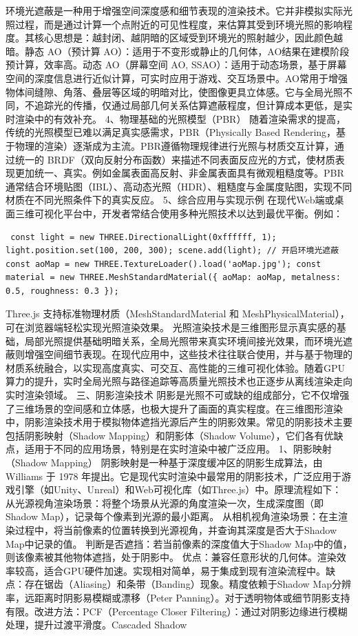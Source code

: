 {{环境光遮蔽是一种用于增强空间深度感和细节表现的渲染技术。它并非模拟实际光照过程，而是通过计算一个点附近的可见性程度，来估算其受到环境光照的影响程度。其核心思想是：越封闭、越阴暗的区域受到环境光的照射越少，因此颜色越暗。静态 AO（预计算 AO）：适用于不变形或静止的几何体，AO结果在建模阶段预计算，效率高。动态 AO（屏幕空间 AO, SSAO）：适用于动态场景，基于屏幕空间的深度信息进行近似计算，可实时应用于游戏、交互场景中。AO常用于增强物体间缝隙、角落、叠层等区域的明暗对比，使图像更具立体感。它与全局光照不同，不追踪光的传播，仅通过局部几何关系估算遮蔽程度，但计算成本更低，是实时渲染中的有效补充。 4、物理基础的光照模型（PBR） 随着渲染需求的提高，传统的光照模型已难以满足真实感需求，PBR（Physically Based Rendering，基于物理的渲染）逐渐成为主流。PBR遵循物理规律进行光照与材质交互计算，通过统一的 BRDF（双向反射分布函数）来描述不同表面反应光的方式，使材质表现更加统一、真实。例如金属表面高反射、非金属表面具有微观粗糙度等。PBR通常结合环境贴图（IBL）、高动态光照（HDR）、粗糙度与金属度贴图，实现不同材质在不同光照条件下的真实反应。 5、综合应用与实现示例 在现代Web端或桌面三维可视化平台中，开发者常结合使用多种光照技术以达到最优平衡。例如： \begin{verbatim} const light = new THREE.DirectionalLight(0xffffff, 1); light.position.set(100, 200, 300); scene.add(light); // 开启环境光遮蔽 const aoMap = new THREE.TextureLoader().load('aoMap.jpg'); const material = new THREE.MeshStandardMaterial({ aoMap: aoMap, metalness: 0.5, roughness: 0.3 }); \end{verbatim} Three.js 支持标准物理材质（MeshStandardMaterial 和 MeshPhysicalMaterial），可在浏览器端轻松实现光照渲染效果。 光照渲染技术是三维图形显示真实感的基础，局部光照提供基础明暗关系，全局光照带来真实环境间接光效果，而环境光遮蔽则增强空间细节表现。在现代应用中，这些技术往往联合使用，并与基于物理的材质系统融合，以实现高度真实、可交互、高性能的三维可视化体验。随着GPU算力的提升，实时全局光照与路径追踪等高质量光照技术也正逐步从离线渲染走向实时渲染领域。 三、阴影渲染技术 阴影是光照不可或缺的组成部分，它不仅增强了三维场景的空间感和立体感，也极大提升了画面的真实程度。在三维图形渲染中，阴影渲染技术用于模拟物体遮挡光源后产生的阴影效果。常见的阴影技术主要包括阴影映射（Shadow Mapping）和阴影体（Shadow Volume），它们各有优缺点，适用于不同的应用场景，特别是在实时渲染中被广泛应用。 1、阴影映射（Shadow Mapping） 阴影映射是一种基于深度缓冲区的阴影生成算法，由 Williams 于 1978 年提出。它是现代实时渲染中最常用的阴影技术，广泛应用于游戏引擎（如Unity、Unreal）和Web可视化库（如Three.js）中。原理流程如下： 从光源视角渲染场景：将整个场景从光源的角度渲染一次，生成深度图（即 Shadow Map），记录每个像素到光源的最小距离。 从相机视角渲染场景：在主渲染过程中，将当前像素的位置转换到光源视角，并查询其深度是否大于Shadow Map中记录的值。 判断是否遮挡：若当前像素的深度值大于Shadow Map中的值，则该像素被其他物体遮挡，处于阴影中。 优点：兼容任意形状的几何体。渲染效率较高，适合GPU硬件加速。实现相对简单，易于集成到现有渲染流程中。缺点：存在锯齿（Aliasing）和条带（Banding）现象。精度依赖于Shadow Map分辨率，远距离时阴影易模糊或漂移（Peter Panning）。对于透明物体或细节阴影支持有限。改进方法：PCF（Percentage Closer Filtering）：通过对阴影边缘进行模糊处理，提升过渡平滑度。Cascaded Shadow }}

